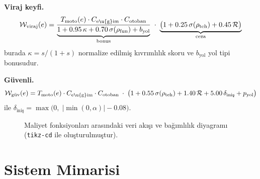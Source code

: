 \documentclass[11pt,a4paper]{article}
\newcommand{\WW}{\mathcal{W}}
\theoremstyle{definition}
\begin{document}
\smallskip\noindent\textbf{Viraj keyfi.}
\begin{equation}\label{eq:viraj}
  \WW_{\text{viraj}}(e) =
    \frac{T_{\mathrm{moto}}(e)\cdot C_{\mathrm{e\u{g}im}}\cdot C_{\mathrm{otoban}}}
         {\underbrace{1 + 0.95\,\kappa + 0.70\,\sigma(\rho_{\text{fun}}) + b_{\text{yol}}}_\text{bonus}}
    \;\cdot\;
    \underbrace{\bigl(1 + 0.25\,\sigma(\rho_{\text{teh}}) + 0.45\,\mathcal{R}\bigr)}_\text{ceza}
\end{equation}
burada $\kappa = s/(1+s)$ normalize edilmi\c{s} kıvrımlılık
skoru ve $b_{\text{yol}}$ yol tipi bonusudur.

\smallskip\noindent\textbf{G\"uvenli.}
\begin{equation}\label{eq:guvenli}
  \WW_{\text{g\"uv}}(e) =
    T_{\mathrm{moto}}(e)\cdot C_{\mathrm{e\u{g}im}}\cdot C_{\mathrm{otoban}}
    \;\cdot\;
    \bigl(1 + 0.55\,\sigma(\rho_{\text{teh}}) + 1.40\,\mathcal{R}
          + 5.00\,\delta_{\text{ini\c{s}}}
          + p_{\text{yol}}\bigr)
\end{equation}
ile $\delta_{\text{ini\c{s}}} = \max\bigl(0,\;|\min(0,\alpha)|-0.08\bigr)$.

\begin{figure}[H]
\centering
{}
\caption{Maliyet fonksiyonlar{\i} aras{\i}ndaki veri ak{\i}\c{s}{\i}
         ve ba\u{g}{\i}ml{\i}l{\i}k diyagram{\i}
         (\texttt{tikz-cd} ile olu\c{s}turulmu\c{s}tur).}
\label{fig:cost-cd}
\end{figure}

\section{Sistem Mimarisi}\label{sec:arch}
\end{document}
